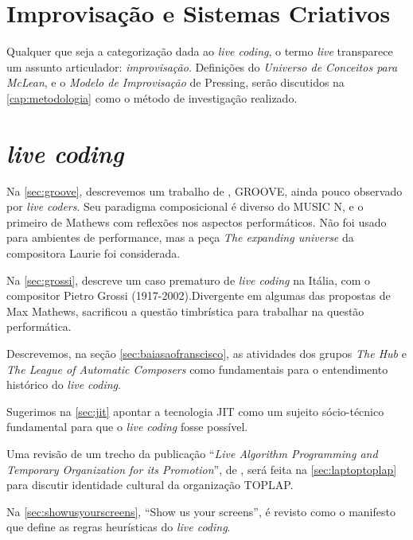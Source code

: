 \section{Improvisação e Sistemas Criativos}\label{sec:universo}

Qualquer que seja a categorização dada ao \emph{live coding}, o termo \emph{live} transparece um assunto articulador: \emph{improvisação}. Definições do \emph{Universo de Conceitos para McLean}, e  o \emph{Modelo de Improvisação} de Pressing, serão discutidos na \autoref{cap:metodologia} como o método de investigação realizado.


\section{\emph{live coding}}\label{cap:trabalhos_relacionados}

Na \autoref{sec:groove}, descrevemos um trabalho de , GROOVE, ainda pouco observado por \emph{live coders}. Seu paradigma composicional é diverso do MUSIC N, e o primeiro de Mathews com reflexões nos aspectos performáticos. Não foi usado para ambientes de performance, mas a peça \emph{The expanding universe} da compositora Laurie  foi considerada.

Na \autoref{sec:grossi},   descreve um caso prematuro de \emph{live coding} na Itália, com o compositor Pietro Grossi (1917-2002).Divergente em algumas das propostas de Max Mathews, sacrificou a questão timbrística para trabalhar na questão performática.

Descrevemos, na seção \autoref{sec:baiasaofranscisco}, as atividades dos grupos \emph{The Hub} e \emph{The League of Automatic Composers} como fundamentais para o entendimento histórico do \emph{live coding}.

Sugerimos na \autoref{sec:jit} apontar a tecnologia JIT \cite{aycock_brief_2003} como um sujeito sócio-técnico fundamental para que o \emph{live coding} fosse possível.

Uma revisão de um trecho da publicação ``\emph{Live Algorithm Programming and Temporary Organization for its Promotion}'', de , será feita na \autoref{sec:laptoptoplap} para discutir identidade cultural da organização TOPLAP. 

Na \autoref{sec:showusyourscreens}, ``Show us your screens'', é revisto como o manifesto que define as regras heurísticas do \emph{live coding}.

